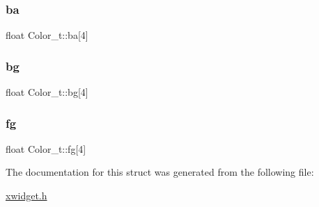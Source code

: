 \subsubsection{\texorpdfstring{ba}{ba}}
{\footnotesize\ttfamily float Color\+\_\+t\+::ba\mbox{[}4\mbox{]}}

\mbox{\label{structColor__t_acf62f86fb2579ce93a4e942ded82ab32}} 
\subsubsection{\texorpdfstring{bg}{bg}}
{\footnotesize\ttfamily float Color\+\_\+t\+::bg\mbox{[}4\mbox{]}}

\mbox{\label{structColor__t_a5491170cc9c33b98a7c0e8a4a25f4c0a}} 
\subsubsection{\texorpdfstring{fg}{fg}}
{\footnotesize\ttfamily float Color\+\_\+t\+::fg\mbox{[}4\mbox{]}}



The documentation for this struct was generated from the following file\+:\begin{DoxyCompactItemize}
\item 
\hyperlink{xwidget_8h}{xwidget.\+h}\end{DoxyCompactItemize}
